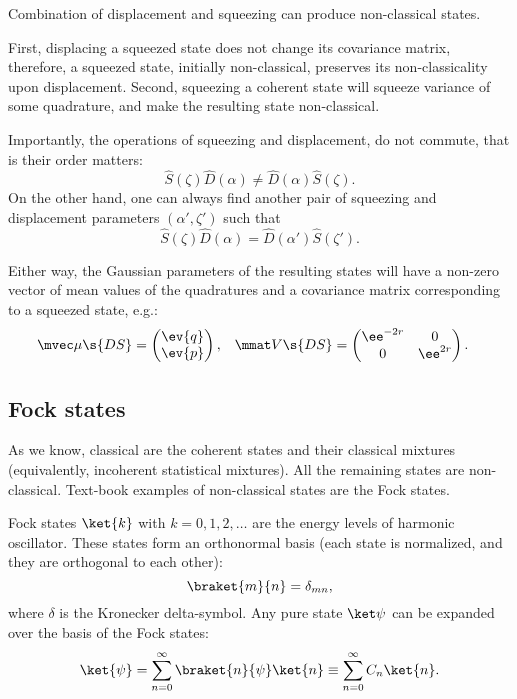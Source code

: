 \documentclass[fontsize=9pt,twoside=semi,bookmarkpackage=false]{scrartcl}
\begin{document}
Combination of displacement and squeezing can produce non-classical states.

First, displacing a squeezed state does not change its covariance matrix, therefore, a squeezed state, initially non-classical, preserves its non-classicality upon displacement.
Second, squeezing a coherent state will squeeze variance of some quadrature, and make the resulting state non-classical.

Importantly, the operations of squeezing and displacement, do not commute, that is their order matters:
\begin{equation}
  \hat S ( \zeta ) \hat D ( \alpha )  \neq \hat D (\alpha ) \hat S ( \zeta ).
\end{equation}
On the other hand, one can always find another pair of squeezing and displacement parameters $(\alpha', \zeta')$ such that
\begin{equation}
  \hat S ( \zeta ) \hat D ( \alpha ) = \hat D (\alpha' ) \hat S ( \zeta' ).
\end{equation}

Either way, the Gaussian parameters of the resulting states will have a non-zero vector of mean values of the quadratures and a covariance matrix corresponding to a squeezed state, e.g.:
\begin{align}
  \mvec \mu\s{DS} & =
  \begin{pmatrix}
    \ev{q} \\ \ev{ p}
  \end{pmatrix},
  &
  \mmat V\s{DS} & =
  \begin{pmatrix}
    \ee^{ - 2 r } & 0
    \\
    0 & \ee^{ 2 r }
  \end{pmatrix}.
\end{align}

\subsection{Fock states} %
\label{sec:fock_states}

As we know, classical are the coherent states and their classical mixtures (equivalently, incoherent statistical mixtures).
All the remaining states are non-classical.
Text-book examples of non-classical states are the Fock states.

Fock states $\ket{k}$ with $k = 0,1,2,\dots$ are the energy levels of harmonic oscillator.
These states form an orthonormal basis (each state is normalized, and they are orthogonal to each other):
\begin{equation}
  \braket{ m }{ n } = \delta_{mn },
\end{equation}
where $\delta$ is the Kronecker delta-symbol.
Any pure state $\ket \psi$ can be expanded over the basis of the Fock states:
\begin{equation}
  \ket{ \psi } = \sum_{n = 0}^\infty \braket{ n }{ \psi } \ket{n }
  \equiv \sum_{n = 0}^\infty C_n \ket{ n }.
\end{equation}
\end{document}
